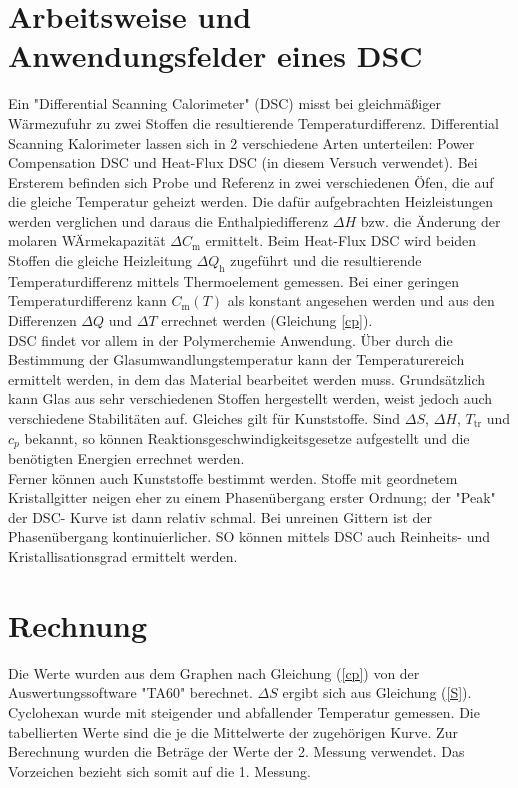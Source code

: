 \documentclass[a4paper,12pt,oneside,onecolum,final,openany]{report}
\begin{document}
\section{Arbeitsweise und Anwendungsfelder eines DSC}
Ein "Differential Scanning Calorimeter" (DSC) misst bei gleichmäßiger Wärmezufuhr zu zwei Stoffen die resultierende Temperaturdifferenz.
Differential Scanning Kalorimeter lassen sich in 2 verschiedene Arten unterteilen: Power Compensation DSC und Heat-Flux DSC (in diesem Versuch verwendet). Bei Ersterem befinden sich Probe und Referenz in zwei verschiedenen Öfen, die auf die gleiche Temperatur geheizt werden. Die dafür aufgebrachten Heizleistungen werden verglichen und daraus die Enthalpiedifferenz $\Delta H$ bzw. die Änderung der molaren WÄrmekapazität $\Delta C_\mathrm{m}$ ermittelt.
Beim Heat-Flux DSC wird beiden Stoffen die gleiche Heizleitung $\Delta Q_\mathrm{h}$ zugeführt und die resultierende Temperaturdifferenz mittels Thermoelement gemessen.
Bei einer geringen Temperaturdifferenz kann $C_\mathrm{m}(T)$ als konstant angesehen werden und aus den Differenzen $\Delta Q$ und $\Delta T$ errechnet werden (Gleichung \ref{cp}).\\

DSC findet vor allem in der Polymerchemie Anwendung. Über durch die Bestimmung der Glasumwandlungstemperatur kann der Temperaturereich ermittelt werden, in dem das Material bearbeitet werden muss. Grundsätzlich kann Glas aus sehr verschiedenen Stoffen hergestellt werden, weist jedoch auch verschiedene Stabilitäten auf. Gleiches gilt für Kunststoffe. 
Sind $\Delta S$, $\Delta H$, $T_\mathrm{tr}$ und $c_p$ bekannt, so können Reaktionsgeschwindigkeitsgesetze aufgestellt und die benötigten Energien errechnet werden.\\ 
Ferner können auch Kunststoffe bestimmt werden.
Stoffe mit geordnetem Kristallgitter neigen eher zu einem Phasenübergang erster Ordnung; der "Peak" der DSC- Kurve ist dann relativ schmal. Bei unreinen Gittern ist der Phasenübergang  kontinuierlicher. SO können mittels DSC auch Reinheits- und Kristallisationsgrad ermittelt werden.\\


\section{Rechnung}

Die Werte wurden aus dem Graphen nach Gleichung (\ref{cp}) von der Auswertungssoftware "TA60" berechnet. 
$\Delta S$ ergibt sich aus Gleichung (\ref{S}). Cyclohexan wurde mit steigender und abfallender Temperatur gemessen. Die tabellierten Werte sind die je die Mittelwerte der zugehörigen Kurve. Zur Berechnung wurden die Beträge der Werte der 2. Messung verwendet. Das Vorzeichen bezieht sich somit auf die 1. Messung.\\
\end{document}
